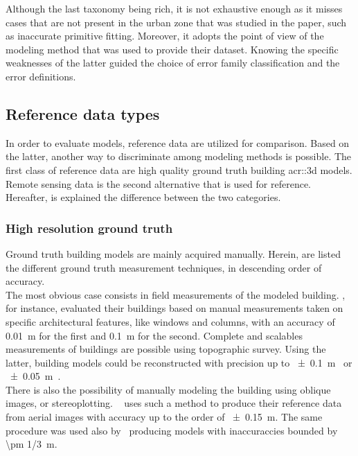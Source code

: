             Although the last taxonomy being rich, it is not exhaustive enough as it misses cases that are not present in the urban zone that was studied in the paper, such as inaccurate primitive fitting.
            Moreover, it adopts the point of view of the modeling method that was used to provide their dataset.
            Knowing the specific weaknesses of the latter guided the choice of error family classification and the error definitions.

    \subsection{Reference data types}
        \label{subsec::state_of_the_art::quality::reference}
        In order to evaluate models, reference data are utilized for comparison.
        Based on the latter, another way to discriminate among modeling methods is possible.
        The first class of reference data are high quality ground truth building \gls{acr::3d} models.
        Remote sensing data is the second alternative that is used for reference.
        Hereafter, is explained the difference between the two categories.

        \subsubsection{High resolution ground truth}
            Ground truth building models are mainly acquired manually.
            Herein, are listed the different ground truth measurement techniques, in descending order of accuracy.\\

            The most obvious case consists in field measurements of the modeled building.
            \textcite{dick2004modelling}, for instance, evaluated their buildings based on manual measurements taken on specific architectural features, like windows and columns, with an accuracy of \SI{0.01}{\m} for the first and \SI{0.1}{\m} for the second.
            Complete and scalables measurements of buildings are possible using topographic survey.
            Using the latter, building models could be reconstructed with precision up to \SI{\pm 0.1}{\m}~\parencite{henricsson19973} or \SI{\pm 0.05}{\m}~\parencite{vogtle2003quality}.\\
            There is also the possibility of manually modeling the building using oblique images, or stereoplotting.
            ~\textcite{zebedin2008fusion} uses such a method to produce their reference data from aerial images with accuracy up to the order of \SI{\pm 0.15}{\m}.
            The same procedure was used also by~\textcite{jaynes2003recognition} producing models with inaccuraccies bounded by \SI{\pm 1/3}{\m}.

